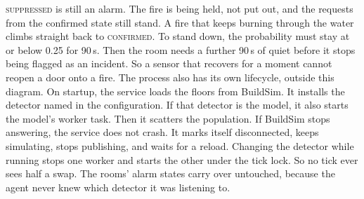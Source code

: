 \textsc{suppressed} is still an alarm. The fire is being held, not put out, and the
requests from the confirmed state still stand. A fire that keeps burning through
the water climbs straight back to \textsc{confirmed}. To stand down, the
probability must stay at or below 0.25 for 90\,s. Then the room needs a further
90\,s of quiet before it stops being flagged as an incident. So a sensor that
recovers for a moment cannot reopen a door onto a fire. The process also has its
own lifecycle, outside this diagram. On startup, the service loads the floors from
BuildSim. It installs the detector named in the configuration. If that detector is
the model, it also starts the model's worker task. Then it scatters the population.
If BuildSim stops answering, the service does not crash. It marks itself
disconnected, keeps simulating, stops publishing, and waits for a reload. Changing
the detector while running stops one worker and starts the other under the tick
lock. So no tick ever sees half a swap. The rooms' alarm states carry over
untouched, because the agent never knew which detector it was listening to.
